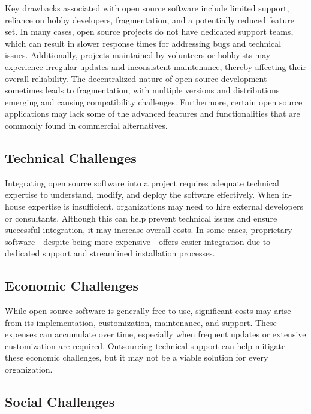 Key drawbacks associated with open source software include limited support, reliance on hobby developers, fragmentation, and a potentially reduced feature set. In many cases, open source projects do not have dedicated support teams, which can result in slower response times for addressing bugs and technical issues. Additionally, projects maintained by volunteers or hobbyists may experience irregular updates and inconsistent maintenance, thereby affecting their overall reliability. The decentralized nature of open source development sometimes leads to fragmentation, with multiple versions and distributions emerging and causing compatibility challenges. Furthermore, certain open source applications may lack some of the advanced features and functionalities that are commonly found in commercial alternatives.

\cite{OpenSource-Software-Risks-Disadvantages}


\subsection{Technical Challenges}

Integrating open source software into a project requires adequate technical expertise to understand, modify, and deploy the software effectively. When in-house expertise is insufficient, organizations may need to hire external developers or consultants. Although this can help prevent technical issues and ensure successful integration, it may increase overall costs. In some cases, proprietary software—despite being more expensive—offers easier integration due to dedicated support and streamlined installation processes.

\subsection{Economic Challenges}

While open source software is generally free to use, significant costs may arise from its implementation, customization, maintenance, and support. These expenses can accumulate over time, especially when frequent updates or extensive customization are required. Outsourcing technical support can help mitigate these economic challenges, but it may not be a viable solution for every organization.

\subsection{Social Challenges}

